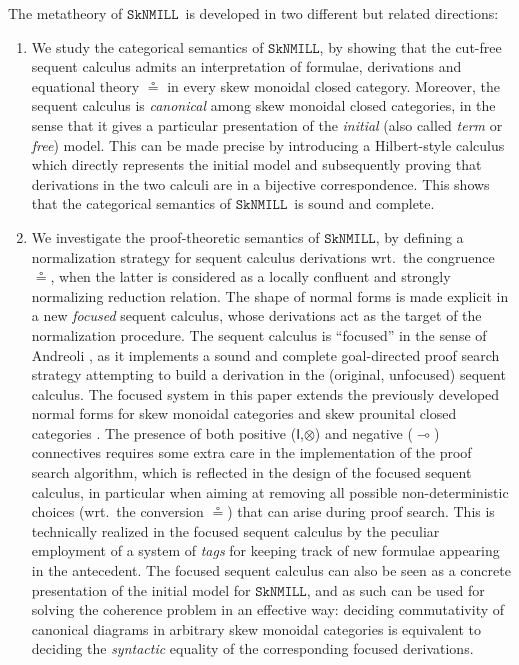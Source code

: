 \documentclass[copyright,creativecommons]{eptcs}
\theoremstyle{definition}
\newcommand{\ot}{\otimes}
\newcommand{\lolli}{\multimap}
\newcommand{\I}{\mathsf{I}}
\newcommand{\SkNMILL}{$\mathtt{SkNMILL}$}
\begin{document}
The metatheory of \SkNMILL\ is developed in two different but related directions:
\begin{enumerate}[($i$)]
  \item We study the categorical semantics of \SkNMILL, by showing that the cut-free sequent calculus admits an interpretation of formulae, derivations and equational theory $\circeq$ in every skew monoidal closed category. Moreover, the sequent calculus is \emph{canonical} among skew monoidal closed categories, in the sense that it gives a particular presentation of the \emph{initial} (also called \emph{term} or \emph{free}) model. This can be made precise by introducing a Hilbert-style calculus which directly represents the initial model and subsequently proving that derivations in the two calculi are in a bijective correspondence.
This shows that the categorical semantics of \SkNMILL\ is sound and
complete.

\item We investigate the proof-theoretic semantics of \SkNMILL, by defining a normalization strategy for sequent calculus derivations wrt.\ the congruence $\circeq$, when the latter is considered as a locally confluent and strongly normalizing reduction relation. The shape of normal forms is made explicit in a new \emph{focused} sequent calculus, whose derivations act as the target of the normalization procedure. The sequent calculus is ``focused'' in the sense of Andreoli \cite{andreoli:logic:1992}, as it implements a sound and complete goal-directed proof search strategy attempting to build a derivation in the (original, unfocused) sequent calculus. The focused system in this paper extends the previously
developed normal forms for skew monoidal categories \cite{uustalu:sequent:2021} and skew prounital closed categories \cite{uustalu:deductive:nodate}. The presence of both positive ($\I$,$\ot$) and negative ($\lolli$) connectives requires some extra care in the implementation of the proof search algorithm, which is reflected in the design of the focused sequent calculus, in particular when aiming at removing all possible non-deterministic choices (wrt.\ the conversion $\circeq$) that can arise during proof search. This is technically realized in the focused sequent calculus by the peculiar employment of a system of \emph{tags} for keeping track of new formulae appearing in the antecedent. The focused sequent calculus can also be seen as a concrete presentation of the initial model for \SkNMILL, and as such can be used for solving the coherence problem in an effective way: deciding commutativity of canonical diagrams in arbitrary skew monoidal categories is equivalent to deciding the \emph{syntactic} equality of the corresponding focused derivations.
\end{enumerate}
\end{document}
